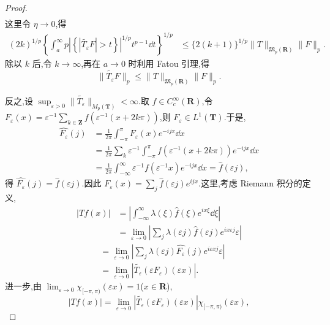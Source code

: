 \begin{proof}
\begin{align*}
\end{align*}
这里令 $\eta \to 0$,得
\begin{align*}
(2k)^{1/p}\left\{\int_{a}^{\infty}p\left|\left\{\left|\widetilde{T_{\varepsilon}}F\right| > t\right\}\right|^{1/p}t^{p-1}\dd t\right\}^{1/p}&\leq \{2(k + 1)\}^{1/p}\|T\|_{\mathfrak{M}_{p}(\mathbf{R})}\|F\|_{p}.
\end{align*}
除以 $k$ 后,令 $k \to \infty$,再在 $a \to 0$ 时利用 Fatou 引理,得
\begin{equation*}
\|\widetilde{T_{\varepsilon}}F\|_{p} \leq \|T\|_{\mathfrak{M}_{p}(\mathbf{R})}\|F\|_{p}.
\end{equation*}

反之,设 $\sup_{\varepsilon>0}\|\widetilde{T_{\varepsilon}}\|_{M_{p}(\mathbf{T})}<\infty$.取 $f\in C_{c}^{\infty}(\mathbf{R})$,令 $F_{\varepsilon}(x)=\varepsilon^{-1}\sum_{k\in\mathbf{Z}}f(\varepsilon^{-1}(x+2k\pi))$,则 $F_{\varepsilon}\in L^{1}(\mathbf{T})$.于是,
\begin{align*}
\widehat{F_{\varepsilon}}(j) &= \frac{1}{2\pi}\int_{-\pi}^{\pi}F_{\varepsilon}(x)e^{-ijx}\dd x\\
&= \frac{1}{2\pi}\sum_{k}\varepsilon^{-1}\int_{-\pi}^{\pi}f(\varepsilon^{-1}(x+2k\pi))e^{-ijx}\dd x\\
&= \frac{1}{2\pi}\int_{-\infty}^{\infty}\varepsilon^{-1}f(\varepsilon^{-1}x)e^{-ijx}\dd x = \widehat{f}(\varepsilon j),
\end{align*}
得 $\widehat{F_{\varepsilon}}(j)=\widehat{f}(\varepsilon j)$.因此 $F_{\varepsilon}(x)=\sum_{j}\widehat{f}(\varepsilon j)e^{ijx}$.这里,考虑 Riemann 积分的定义,
\begin{align*}
|Tf(x)| &= \left|\int_{-\infty}^{\infty}\lambda(\xi)\widehat{f}(\xi)e^{ix\xi}\dd\xi\right|\\
&= \lim_{\varepsilon \to 0}\left|\sum_{j}\lambda(\varepsilon j)\widehat{f}(\varepsilon j)e^{ix\varepsilon j}\varepsilon\right|
\end{align*}
\begin{align*}
&= \lim_{\varepsilon \to 0}\left|\sum_{j}\lambda(\varepsilon j)\widehat{F_{\varepsilon}}(j)e^{i\varepsilon xj}\varepsilon\right|\\
&= \lim_{\varepsilon \to 0}\left|\widetilde{T_{\varepsilon}}(\varepsilon F_{\varepsilon})(\varepsilon x)\right|.
\end{align*}
进一步,由 $\lim_{\varepsilon\to0}\chi_{[-\pi,\pi)}(\varepsilon x)=1$($x\in\mathbf{R}$),
\begin{equation*}
|Tf(x)| = \lim_{\varepsilon \to 0}\left|\widetilde{T_{\varepsilon}}(\varepsilon F_{\varepsilon})(\varepsilon x)\right|\chi_{[-\pi,\pi)}(\varepsilon x),

\end{equation*}
\end{proof}
